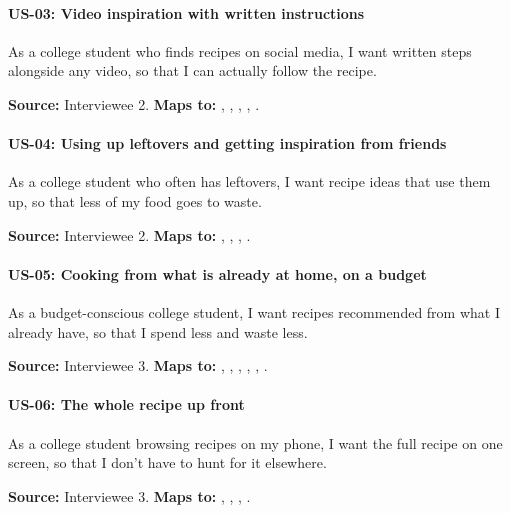 \paragraph{US-03: Video inspiration with written instructions}
As a college student who finds recipes on social media, I want written steps alongside any video, so that I can actually follow the recipe.

\noindent\textbf{Source:} Interviewee 2. \textbf{Maps to:} , , , , .

\paragraph{US-04: Using up leftovers and getting inspiration from friends}
As a college student who often has leftovers, I want recipe ideas that use them up, so that less of my food goes to waste.

\noindent\textbf{Source:} Interviewee 2. \textbf{Maps to:} , , , .

\paragraph{US-05: Cooking from what is already at home, on a budget}
As a budget-conscious college student, I want recipes recommended from what I already have, so that I spend less and waste less.

\noindent\textbf{Source:} Interviewee 3. \textbf{Maps to:} , , , , , .

\paragraph{US-06: The whole recipe up front}
As a college student browsing recipes on my phone, I want the full recipe on one screen, so that I don't have to hunt for it elsewhere.

\noindent\textbf{Source:} Interviewee 3. \textbf{Maps to:} , , , .

